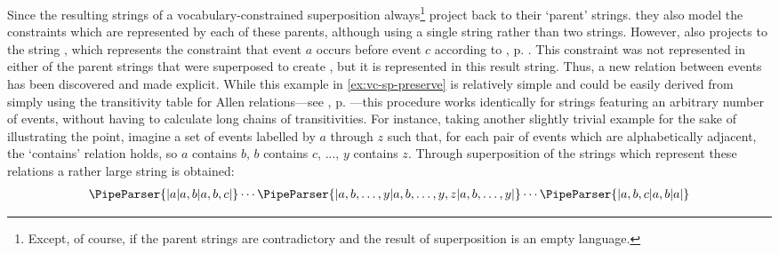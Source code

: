 \documentclass[a4paper,12pt,leqno]{article}
\newcommand{\vph}[1]{\vphantom{#1}}
\newcommand{\ebox}[1]{\fbox{$\vph{'(),}#1$}}
\newcommand{\nbBefore}[2]{\ebox{#1}\ebox{}\ebox{#2}}
\newcommand{\Before}[2]{\ebox{}\nbBefore{#1}{#2}\ebox{}}
\newcommand{\EventString}[1]{%
	\renewcommand*{\do}[1]{\ebox{##1}}%
	\PipeParser{#1}%
}
\begin{document}
Since the resulting strings of a vocabulary-constrained superposition always\footnote{Except, of course, if the parent strings are contradictory and the result of superposition is an empty language.} project back to their `parent' strings. they also model the constraints which are represented by each of these parents, although using a single string rather than two strings. However, \EventString{{}|a|{}|b|{}|c|{}} also projects to the string \Before{a}{c}, which represents the constraint that event $a$ occurs before event $c$ according to , p. \pageref{tab:allen-rels-strings}. This constraint was not represented in either of the parent strings that were superposed to create \EventString{{}|a|{}|b|{}|c|{}}, but it is represented in this result string. Thus, a new relation between events has been discovered and made explicit. While this example in \cref{ex:vc-sp-preserve} is relatively simple and could be easily derived from simply using the transitivity table for Allen relations---see , p. \pageref{tab:allen-trans-table}---this procedure works identically for strings featuring an arbitrary number of events, without having to calculate long chains of transitivities. For instance, taking another slightly trivial example for the sake of illustrating the point, imagine a set of events labelled by $a$ through $z$ such that, for each pair of events which are alphabetically adjacent, the `contains' relation holds, so $a$ contains $b$, $b$ contains $c$, ..., $y$ contains $z$. Through superposition of the strings which represent these relations a rather large string is obtained:
\begin{align}
	\EventString{{}|a|a,b|a,b,c|}\cdots\EventString{|a,b,\ldots,y|a,b,\ldots,y,z|a,b,\ldots,y|}\cdots\EventString{|a,b,c|a,b|a|{}}\label{ex:a-z-string}
\end{align}
\end{document}

